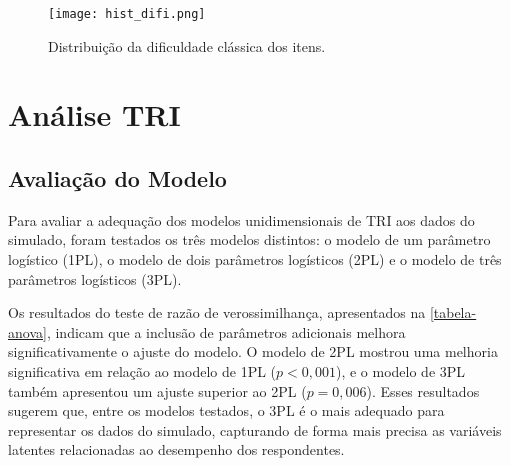 \begin{figure}[H]
	\centering
	\texttt{[image: hist\_difi.png]}
	\caption{Distribuição da dificuldade clássica dos itens.}
	\label{fig:hist_difi}
\end{figure}

\newpage
\section{Análise TRI}

\subsection{Avaliação do Modelo}

Para avaliar a adequação dos modelos unidimensionais de TRI aos dados do simulado, foram
testados os três modelos distintos: o modelo de um parâmetro logístico (1PL), o modelo de dois parâmetros logísticos (2PL) e o modelo de três parâmetros logísticos (3PL).

\begin{table}[!htb]
\end{table}



Os resultados do teste de razão de verossimilhança, apresentados na \ref{tabela-anova}, indicam que a inclusão de parâmetros adicionais melhora significativamente o ajuste do modelo. O modelo de 2PL mostrou uma melhoria significativa em relação ao modelo de 1PL ($p < 0,001$), e o modelo de 3PL também apresentou um ajuste superior ao 2PL ($p = 0,006$). Esses resultados sugerem que, entre os modelos testados, o 3PL é o mais adequado para representar os dados do simulado, capturando de forma mais precisa as variáveis latentes relacionadas ao desempenho dos respondentes.

